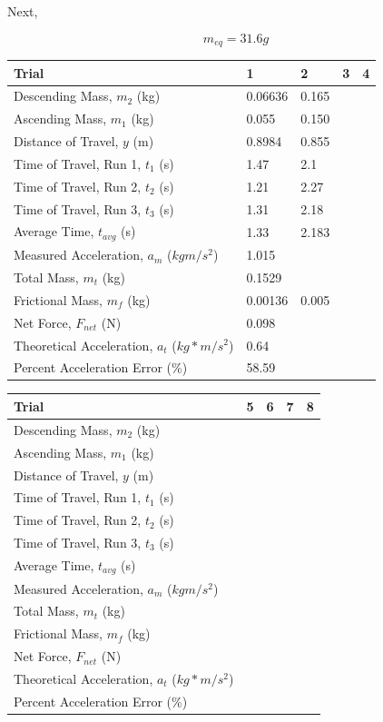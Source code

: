 \documentclass[11pt, titlepage]{article}
\begin{document}
Next, 

\begin{center}
$$m_{eq} = 31.6 g$$
\begin{tabular}
{|m{7em}|m{7em}|m{7em}|m{7em}|m{7em}|}
\hline
Trial & 1 & 2 & 3 & 4 \\
\hline
Descending Mass, $m_2$ (kg) & 0.06636 & 0.165 & & \\
\hline
Ascending Mass, $m_1$ (kg) & 0.055 & 0.150 & & \\
\hline
Distance of Travel, $y$ (m) & 0.8984 & 0.855 & & \\
\hline
Time of Travel, Run 1, $t_1$ (s) & 1.47 & 2.1 & & \\
\hline
Time of Travel, Run 2, $t_2$ (s) & 1.21 & 2.27 & & \\
\hline
Time of Travel, Run 3, $t_3$ (s) & 1.31 & 2.18 & & \\
\hline
Average Time, $t_{avg}$ (s) & 1.33 & 2.183 & & \\
\hline
Measured Acceleration, $a_m$ ($kgm/s^2$) & 1.015 & & & \\
\hline
Total Mass, $m_t$ (kg) & 0.1529 & & & \\
\hline
Frictional Mass, $m_f$ (kg) & 0.00136 & 0.005 & & \\
\hline
Net Force, $F_{net}$ (N) & 0.098 & & & \\ 
\hline
Theoretical Acceleration, $a_t$ ($kg*m/s^2$) & 0.64 & & & \\
\hline
Percent Acceleration Error (\%) & 58.59 & & & \\
\hline
\end{tabular}
\begin{tabular}
{|m{7em}|m{7em}|m{7em}|m{7em}|m{7em}|}
\hline
Trial & 5 & 6 & 7 & 8 \\
\hline
Descending Mass, $m_2$ (kg) & & & & \\
\hline
Ascending Mass, $m_1$ (kg) & & & & \\
\hline
Distance of Travel, $y$ (m) & & & & \\
\hline
Time of Travel, Run 1, $t_1$ (s) & & & & \\
\hline
Time of Travel, Run 2, $t_2$ (s) & & & & \\
\hline
Time of Travel, Run 3, $t_3$ (s) & & & & \\
\hline
Average Time, $t_{avg}$ (s) & & & & \\
\hline
Measured Acceleration, $a_m$ ($kgm/s^2$) & & & & \\
\hline
Total Mass, $m_t$ (kg) & & & & \\
\hline
Frictional Mass, $m_f$ (kg) & & & & \\
\hline
Net Force, $F_{net}$ (N) & & & & \\ 
\hline
Theoretical Acceleration, $a_t$ ($kg*m/s^2$) & & & & \\
\hline
Percent Acceleration Error (\%) & & & & \\
\hline
\end{tabular}

\end{center}
\end{document}
